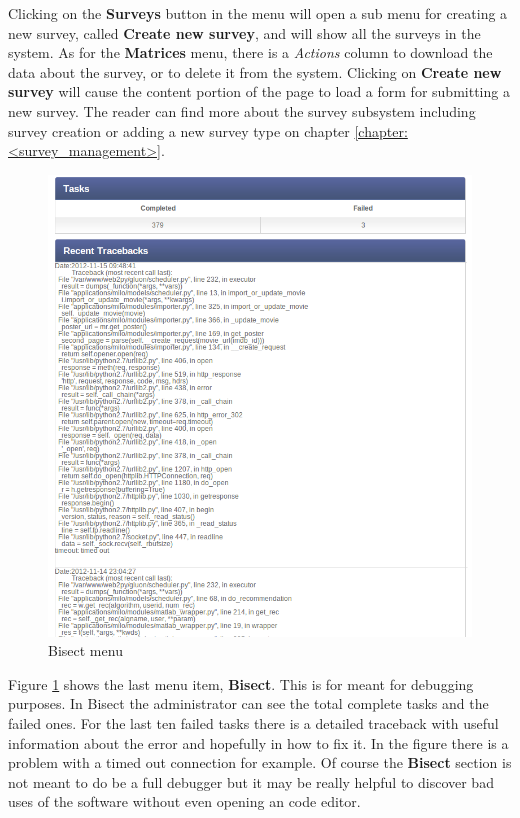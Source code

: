 Clicking on the \textbf{Surveys} button in the menu will open a sub menu for creating a new survey, called \textbf{Create new survey}, and will show all the surveys in the system. As for the \textbf{Matrices} menu, there is a \textit{Actions} column to download the data about the survey, or to delete it from the system. Clicking on \textbf{Create new survey} will cause the content portion of the page to load a form for submitting a new survey. The reader can find more about the survey subsystem including survey creation or adding a new survey type on chapter \ref{chapter:<survey_management>}.

\begin{figure}
  \centering
  \includegraphics[width=\textwidth]{figures/bisect.png}
  \caption{Bisect menu}
  \label{fig:bisect_menu}
\end{figure}

Figure \ref{fig:bisect_menu} shows the last menu item, \textbf{Bisect}. This is for meant for debugging purposes. In Bisect the administrator can see the total complete tasks and the failed ones. For the last ten failed tasks there is a detailed traceback with useful information about the error and hopefully in how to fix it. In the figure there is a problem with a timed out connection for example. Of course the \textbf{Bisect} section is not meant to do be a full debugger but it may be really helpful to discover bad uses of the software without even opening an code editor.

